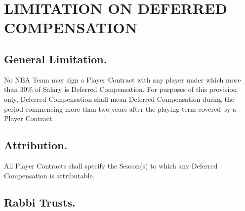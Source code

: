 \documentclass[
]{book}
\begin{document}
\hypertarget{limitation-on-deferred-compensation}{%
\chapter{LIMITATION ON DEFERRED COMPENSATION}\label{limitation-on-deferred-compensation}}

\hypertarget{general-limitation.-1}{%
\section{General Limitation.}\label{general-limitation.-1}}

No NBA Team may sign a Player Contract with any player under which more than 30\% of Salary is Deferred Compensation. For purposes of this provision only, Deferred Compensation shall mean Deferred Compensation during the period commencing more than two years after the playing term covered by a Player Contract.

\hypertarget{attribution.}{%
\section{Attribution.}\label{attribution.}}

All Player Contracts shall specify the Season(s) to which any Deferred Compensation is attributable.

\hypertarget{rabbi-trusts.}{%
\section{Rabbi Trusts.}\label{rabbi-trusts.}}
\end{document}
